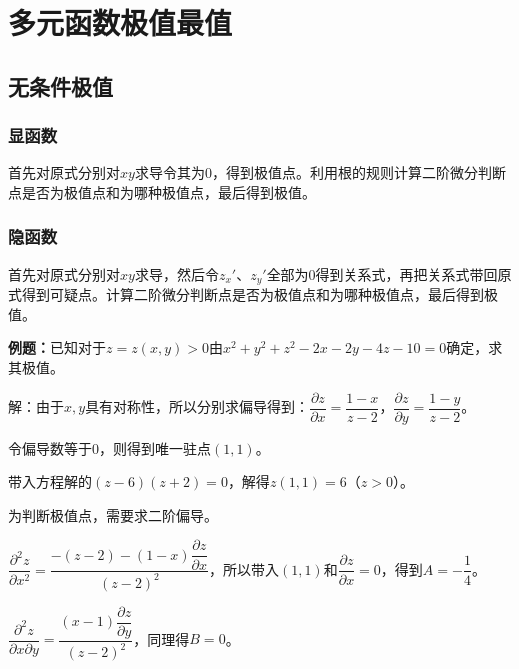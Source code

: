 \documentclass[UTF8, 12pt]{ctexart}
\begin{document}



\section{多元函数极值最值}

\subsection{无条件极值}

\subsubsection{显函数}

首先对原式分别对$xy$求导令其为0，得到极值点。利用根的规则计算二阶微分判断点是否为极值点和为哪种极值点，最后得到极值。

\subsubsection{隐函数}

首先对原式分别对$xy$求导，然后令$z_x'$、$z_y'$全部为0得到关系式，再把关系式带回原式得到可疑点。计算二阶微分判断点是否为极值点和为哪种极值点，最后得到极值。

\textbf{例题：}已知对于$z=z(x,y)>0$由$x^2+y^2+z^2-2x-2y-4z-10=0$确定，求其极值。

解：由于$x,y$具有对称性，所以分别求偏导得到：$\dfrac{\partial z}{\partial x}=\dfrac{1-x}{z-2}$，$\dfrac{\partial z}{\partial y}=\dfrac{1-y}{z-2}$。

令偏导数等于0，则得到唯一驻点$(1,1)$。

带入方程解的$(z-6)(z+2)=0$，解得$z(1,1)=6$（$z>0$）。

为判断极值点，需要求二阶偏导。

$\dfrac{\partial^2z}{\partial x^2}=\dfrac{-(z-2)-(1-x)\dfrac{\partial z}{\partial x}}{(z-2)^2}$，所以带入$(1,1)$和$\dfrac{\partial z}{\partial x}=0$，得到$A=-\dfrac{1}{4}$。

$\dfrac{\partial^2z}{\partial x\partial y}=\dfrac{(x-1)\dfrac{\partial z}{\partial y}}{(z-2)^2}$，同理得$B=0$。
\end{document}
